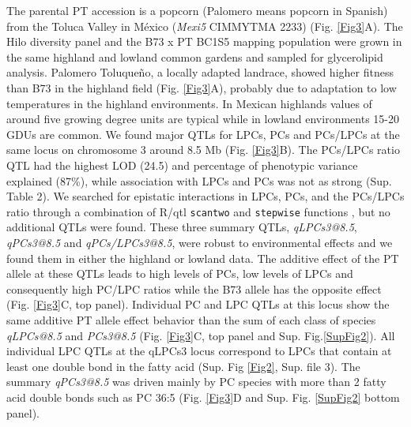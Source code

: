 \documentclass[9pt,twocolumn,twoside,lineno]{BioRxiv}
\def\code#1{\texttt{#1}}
\begin{document}
The parental PT accession is a popcorn (Palomero means popcorn in Spanish) from the Toluca Valley in México (\textit{Mexi5} CIMMYTMA 2233) (Fig. \ref{Fig3}A). 
The Hilo diversity panel and the B73 x PT BC1S5 mapping population were grown in the same highland and lowland common gardens and sampled for glycerolipid analysis.
Palomero Toluqueño, a locally adapted landrace, showed higher fitness than B73 in the highland field (Fig. \ref{Fig3}A), probably due to adaptation to low temperatures in the highland environments.  
In Mexican highlands values of around five growing degree units are typical while in lowland environments 15-20 GDUs are common. 
We found major QTLs for LPCs, PCs and PCs/LPCs at the same locus on chromosome 3 around 8.5 Mb (Fig. \ref{Fig3}B). 
The PCs/LPCs ratio QTL had the highest LOD (24.5) and percentage of phenotypic variance explained (87\%), while association with LPCs and PCs was not as strong (Sup. Table 2).
We searched for epistatic interactions in LPCs, PCs, and the PCs/LPCs ratio through a combination of R/qtl \code{scantwo} and \code{stepwise} functions \cite{Broman2003-ac}, but no additional QTLs were found.
These three summary QTLs, \textit{qLPCs3@8.5}, \textit{qPCs3@8.5} and \textit{qPCs/LPCs3@8.5}, were robust to environmental effects and we found them in either the highland or lowland data.
The additive effect of the PT allele at these QTLs leads to high levels of PCs, low levels of LPCs and consequently high PC/LPC ratios while the B73 allele has the opposite effect (Fig. \ref{Fig3}C, top panel).
Individual PC and LPC QTLs at this locus show the same additive PT allele effect behavior than the sum of each class of species \textit{qLPCs@8.5} and \textit{PCs3@8.5} (Fig. \ref{Fig3}C, top panel and Sup. Fig.\ref{SupFig2}). 
All individual LPC QTLs at the qLPCs3 locus correspond to LPCs that contain at least one double bond in the fatty acid (Sup. Fig \ref{Fig2}, Sup. file 3).
The summary \textit{qPCs3@8.5} was driven mainly by PC species with more than 2 fatty acid double bonds such as PC 36:5 (Fig. \ref{Fig3}D and Sup. Fig. \ref{SupFig2} bottom panel).
\end{document}
